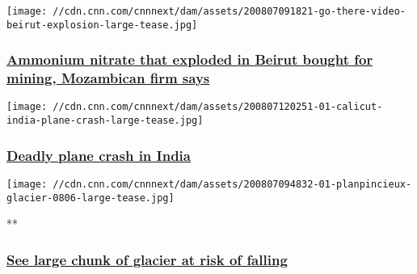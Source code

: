 \href{/2020/08/07/middleeast/beirut-lebanon-ammonium-nitrate-explosion/index.html}{}

\texttt{[image: //cdn.cnn.com/cnnnext/dam/assets/200807091821-go-there-video-beirut-explosion-large-tease.jpg]}

\hypertarget{ammonium-nitrate-that-exploded-in-beirut-bought-for-mining-mozambican-firm-says--1}{%
\subsubsection{\texorpdfstring{\href{/2020/08/07/middleeast/beirut-lebanon-ammonium-nitrate-explosion/index.html}{Ammonium
nitrate that exploded in Beirut bought for mining, Mozambican firm says
}}{Ammonium nitrate that exploded in Beirut bought for mining, Mozambican firm says }}\label{ammonium-nitrate-that-exploded-in-beirut-bought-for-mining-mozambican-firm-says--1}}

\href{/world/live-news/india-plane-crash-august-2020/index.html}{}

\texttt{[image: //cdn.cnn.com/cnnnext/dam/assets/200807120251-01-calicut-india-plane-crash-large-tease.jpg]}

\hypertarget{deadly-plane-crash-in-india}{%
\subsubsection{\texorpdfstring{\href{/world/live-news/india-plane-crash-august-2020/index.html}{Deadly
plane crash in
India}}{Deadly plane crash in India}}\label{deadly-plane-crash-in-india}}

\href{/videos/world/2020/08/07/evacuation-glacier-collapse-mont-blanc-italy-lon-orig-na.cnn}{}

\texttt{[image: //cdn.cnn.com/cnnnext/dam/assets/200807094832-01-planpincieux-glacier-0806-large-tease.jpg]}

**

\hypertarget{see-large-chunk-of-glacier-at-risk-of-falling}{%
\subsubsection{\texorpdfstring{\href{/videos/world/2020/08/07/evacuation-glacier-collapse-mont-blanc-italy-lon-orig-na.cnn}{See
large chunk of glacier at risk of
falling}}{See large chunk of glacier at risk of falling}}\label{see-large-chunk-of-glacier-at-risk-of-falling}}

\href{/videos/world/2020/08/07/beirut-lebanon-explosion-hospital-icu-wedeman-pkg-intl-ldn-vpx.cnn}{}

